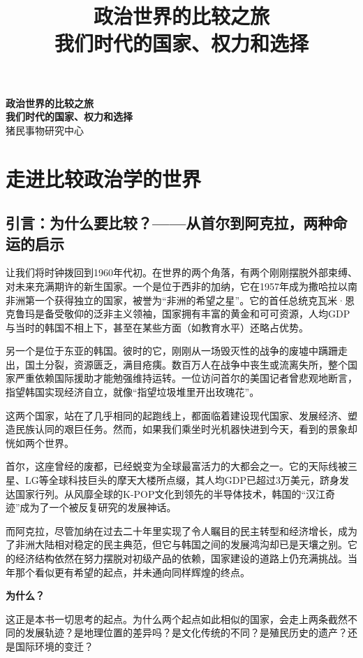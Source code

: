 \documentclass[a5paper, 11pt, openany]{ctexbook}
\title{
    {\Huge\bfseries\songti 政治世界的比较之旅}\\[1cm]
    {\LARGE\songti 我们时代的国家、权力和选择}
}
\author{} %
\date{}   %
\newcommand{\publisher}{猪民事物研究中心} %
\renewcommand{\maketitle}{
    \begin{titlepage}
        \thispagestyle{empty} %
        \centering
        \vspace*{\stretch{1.5}}
        {\huge\bfseries\songti 政治世界的比较之旅}\\[1cm]
        {\large\bfseries\songti 我们时代的国家、权力和选择}\\[1cm] %

        \vfill %
        {\large \publisher} %
    \end{titlepage}
}
\begin{document}
\frontmatter %
\pagestyle{fancy} %
\maketitle
\tableofcontents

\mainmatter %
\pagestyle{fancy} %

\part{走进比较政治学的世界}

\chapter{引言：为什么要比较？——从首尔到阿克拉，两种命运的启示}

让我们将时钟拨回到1960年代初。在世界的两个角落，有两个刚刚摆脱外部束缚、对未来充满期许的新生国家。一个是位于西非的加纳，它在1957年成为撒哈拉以南非洲第一个获得独立的国家，被誉为“非洲的希望之星”。它的首任总统克瓦米·恩克鲁玛是备受敬仰的泛非主义领袖，国家拥有丰富的黄金和可可资源，人均GDP与当时的韩国不相上下，甚至在某些方面（如教育水平）还略占优势。

另一个是位于东亚的韩国。彼时的它，刚刚从一场毁灭性的战争的废墟中蹒跚走出，国土分裂，资源匮乏，满目疮痍。数百万人在战争中丧生或流离失所，整个国家严重依赖国际援助才能勉强维持运转。一位访问首尔的美国记者曾悲观地断言，指望韩国实现经济自立，就像“指望垃圾堆里开出玫瑰花”。

这两个国家，站在了几乎相同的起跑线上，都面临着建设现代国家、发展经济、塑造民族认同的艰巨任务。然而，如果我们乘坐时光机器快进到今天，看到的景象却恍如两个世界。

首尔，这座曾经的废都，已经蜕变为全球最富活力的大都会之一。它的天际线被三星、LG等全球科技巨头的摩天大楼所点缀，其人均GDP已超过3万美元，跻身发达国家行列。从风靡全球的K-POP文化到领先的半导体技术，韩国的“汉江奇迹”成为了一个被反复研究的发展神话。

而阿克拉，尽管加纳在过去二十年里实现了令人瞩目的民主转型和经济增长，成为了非洲大陆相对稳定的民主典范，但它与韩国之间的发展鸿沟却已是天壤之别。它的经济结构依然在努力摆脱对初级产品的依赖，国家建设的道路上仍充满挑战。当年那个看似更有希望的起点，并未通向同样辉煌的终点。

\textbf{为什么？}

这正是本书一切思考的起点。为什么两个起点如此相似的国家，会走上两条截然不同的发展轨迹？是地理位置的差异吗？是文化传统的不同？是殖民历史的遗产？还是国际环境的变迁？
\end{document}
